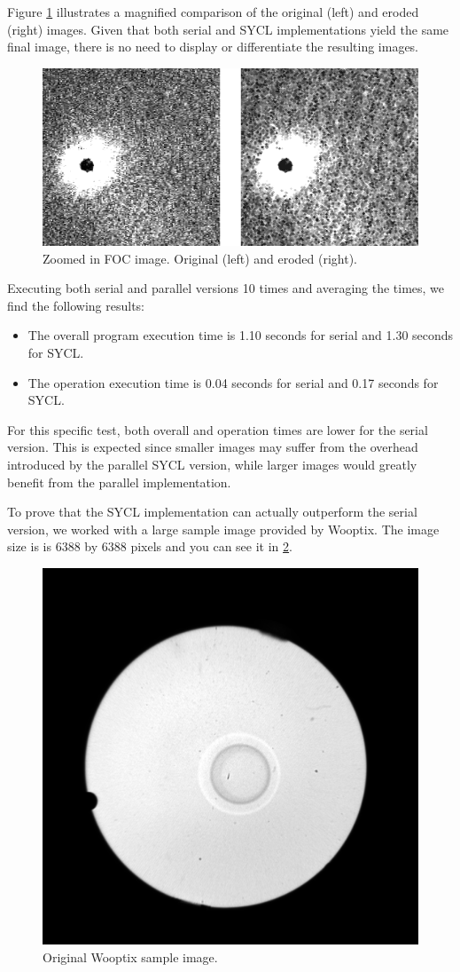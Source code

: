 Figure \ref{fig:result-foc} illustrates a magnified comparison of the original (left) and eroded (right) images.
Given that both serial and SYCL implementations yield the same final image, there is no need to display or differentiate the resulting images.

\begin{figure}[H]
    \centering
    \includegraphics[width=0.7\linewidth]{images/FOC-result.png}
    \caption{Zoomed in FOC image. Original (left) and eroded (right).}
    \label{fig:result-foc}
\end{figure}

Executing both serial and parallel versions 10 times and averaging the times, we find the following results:

\begin{itemize}
    \item The overall program execution time is 1.10 seconds for serial and 1.30 seconds for SYCL.
    \item The operation execution time is 0.04 seconds for serial and 0.17 seconds for SYCL.
\end{itemize}

For this specific test, both overall and operation times are lower for the serial version.
This is expected since smaller images may suffer from the overhead introduced by the parallel SYCL version, while larger images would greatly benefit from the parallel implementation.

To prove that the SYCL implementation can actually outperform the serial version, we worked with a large sample image provided by Wooptix.
The image size is is 6388 by 6388 pixels and you can see it in \ref{fig:og-wooptix}.

\begin{figure}[H]
    \centering
    \includegraphics[width=0.5\linewidth]{images/og-wooptix.png}
    \caption{Original Wooptix sample image.}
    \label{fig:og-wooptix}
\end{figure}

